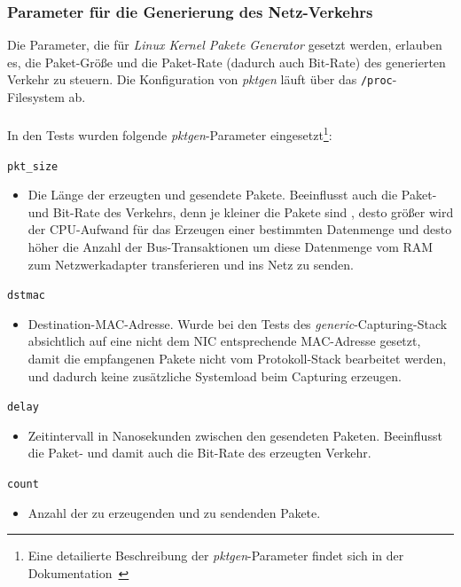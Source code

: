 \subsubsection{Parameter für die Generierung des Netz-Verkehrs}
Die Parameter, die für \emph{Linux Kernel Pakete Generator} gesetzt werden, 
erlauben es, die Paket-Größe und die Paket-Rate (dadurch auch Bit-Rate)
des generierten Verkehr zu steuern. Die Konfiguration von \emph{pktgen}
läuft über das \verb+/proc+-Filesystem ab.\\\\
In den Tests wurden folgende \emph{pktgen}-Parameter
eingesetzt\footnote{Eine detailierte Beschreibung der \emph{pktgen}-Parameter findet sich in
der Dokumentation~\cite{linux_pktgen}}:
\begin{description}
\item \verb+pkt_size+	
	\begin{itemize}
		\item Die Länge der erzeugten und gesendete Pakete. Beeinflusst auch 
			die Paket- und Bit-Rate des Verkehrs, denn je kleiner die Pakete sind ,
			desto größer wird der CPU-Aufwand für das Erzeugen einer bestimmten Datenmenge
			und desto höher die Anzahl der Bus-Transaktionen um diese Datenmenge 
			vom RAM zum Netzwerkadapter transferieren und ins Netz zu senden.
	\end{itemize}
\item  \verb+dstmac+	
	\begin{itemize}
		\item  Destination-MAC-Adresse. Wurde bei den Tests des
			\emph{generic}-Capturing-Stack absichtlich auf eine nicht dem NIC
			entsprechende MAC-Adresse gesetzt, damit die empfangenen Pakete
			nicht vom Protokoll-Stack bearbeitet werden, und dadurch keine
			zusätzliche Systemload beim Capturing erzeugen. 
	\end{itemize}
\item  \verb+delay+
	\begin{itemize}
		\item Zeitintervall in Nanosekunden zwischen den gesendeten Paketen.
			Beeinflusst die Paket- und damit auch die Bit-Rate des erzeugten
			Verkehr.
	\end{itemize}
\item  \verb+count+
	\begin{itemize}
		\item Anzahl der zu erzeugenden und zu sendenden Pakete. 	
	\end{itemize}
\end{description}

